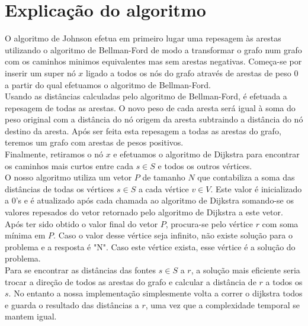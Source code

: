 \documentclass{scrartcl}
\begin{document}
\section*{Explicação do algoritmo}
O algoritmo de Johnson efetua em primeiro lugar uma repesagem às arestas utilizando o algoritmo de Bellman-Ford de modo a transformar o grafo num grafo com os caminhos minimos equivalentes mas sem arestas negativas. Começa-se por inserir um super nó $x$ ligado a todos os nós do grafo através de arestas de peso 0 a partir do qual efetuamos o algoritmo de Bellman-Ford.\\
Usando as distâncias calculadas pelo algoritmo de Bellman-Ford, é efetuada a repesagem de todas as arestas. O novo peso de cada aresta será igual à soma do peso original com a distância do nó origem da aresta subtraindo a distância do nó destino da aresta. Após ser feita esta repesagem a todas as arestas do grafo, teremos um grafo com arestas de pesos positivos.\\
Finalmente, retiramos o nó $x$ e efetuamos o algoritmo de Dijkstra para encontrar os caminhos mais curtos entre cada $s \in S$ e todos os outros vértices. \\
O nosso algoritmo utiliza um vetor $P$ de tamanho $N$ que contabiliza a soma das distâncias de todas os vértices $s \in S$ a cada vértice $v \in V$. Este valor é inicializado a 0's e é atualizado após cada chamada ao algoritmo de Dijkstra somando-se os valores repesados do vetor retornado pelo algoritmo de Dijkstra a este vetor. \\
Após ter sido obtido o valor final do vetor $P$, procura-se pelo vértice $r$ com soma mínima em $P$. Caso o valor desse vértice seja infinito, não existe solução para o problema e a resposta é "N". Caso este vértice exista, esse vértice é a solução do problema.\\
Para se encontrar as distâncias das fontes $s \in S$ a $r$, a solução mais eficiente seria trocar a direção de todos as arestas do grafo e calcular a distância de $r$ a todos os $s$. No entanto a nossa implementação simplesmente volta a correr o dijkstra todos e guarda o resultado das distâncias a $r$, uma vez que a complexidade temporal se mantem igual.
\end{document}
